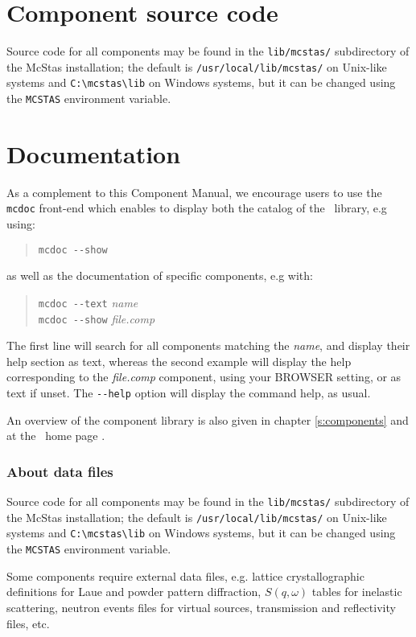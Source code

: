 \section{Component source code}
Source code for all components may be found in the \verb+lib/mcstas/+
subdirectory of the McStas installation;
the default is \verb+/usr/local/lib/mcstas/+
on Unix-like systems and \verb+C:\mcstas\lib+ on Windows systems, but it can be
changed using the \verb+MCSTAS+ environment variable.

\section{Documentation}
As a complement to this Component Manual, we encourage users to use
the \verb+mcdoc+ front-end which enables to display both the
catalog of the \MCS\ library, e.g using: 
\begin{quote}
  \verb|mcdoc --show|
\end{quote}
as well as the documentation of specific components, e.g with:
\begin{quote}
  \verb|mcdoc --text| {\it name} \\
  \verb|mcdoc --show| {\it file.comp}
\end{quote}
The first line will search for all components matching the {\it name},
and display their help section as text,
whereas the second example will display the help corresponding to
the {\it file.comp} component, using your
BROWSER setting, or as text if unset.
The \verb+--help+ option will display the command help, as usual.

An overview of the component library is also given in chapter \ref{s:components} and at the \MCS\ home page \cite{mcstas_webpage}.

\subsubsection{About data files}
Source code for all components may be found in the \verb+lib/mcstas/+
subdirectory of the McStas installation;
the default is \verb+/usr/local/lib/mcstas/+
on Unix-like systems and \verb+C:\mcstas\lib+ on Windows systems, but it can be
changed using the \verb+MCSTAS+ environment variable.

Some components require external data files, e.g. lattice crystallographic definitions for Laue and powder pattern diffraction, $S(q,\omega)$ tables for inelastic scattering, neutron events files for virtual sources, transmission and reflectivity files, etc.

